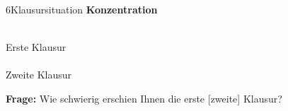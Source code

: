 \documentclass[xcolor=table,9pt,aspectratio=169]{beamer}
\begin{document}
\begin{frame}{\vspace*{10mm}6\hspace*{1em}Klausursituation}
\textbf{Konzentration}\\
\begin{multicols}{2}
   \begin{center}
      \\Erste Klausur\\
      \\Zweite Klausur\\
   \end{center}
\end{multicols}
\textbf{Frage:} Wie schwierig erschien Ihnen die erste [zweite] Klausur?
\end{frame}
\end{document}
